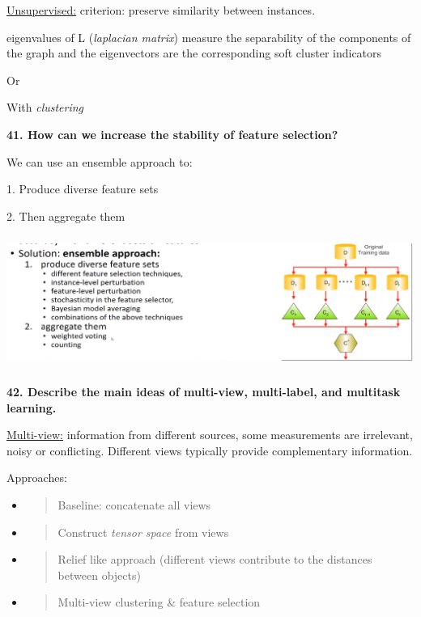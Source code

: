 \underline{Unsupervised:} criterion: preserve similarity between
instances.

eigenvalues of L (\emph{laplacian matrix}) measure the separability of
the components of the graph and the eigenvectors are the corresponding
soft cluster indicators

Or

With \emph{clustering}

\textbf{41. How can we increase the stability of feature selection?}

We can use an ensemble approach to:

1. Produce diverse feature sets

2. Then aggregate them

\includegraphics[width=5.91146in,height=1.71993in]{media/image36.png}

\textbf{42. Describe the main ideas of multi-view, multi-label, and
multitask learning.}

\underline{Multi-view:} information from different sources, some
measurements are irrelevant, noisy or conflicting. Different views
typically provide complementary information.

Approaches:

\begin{itemize}
\item
  \begin{quote}
  Baseline: concatenate all views
  \end{quote}
\item
  \begin{quote}
  Construct \emph{tensor space} from views
  \end{quote}
\item
  \begin{quote}
  Relief like approach (different views contribute to the distances
  between objects)
  \end{quote}
\item
  \begin{quote}
  Multi-view clustering \& feature selection
  \end{quote}
\end{itemize}

